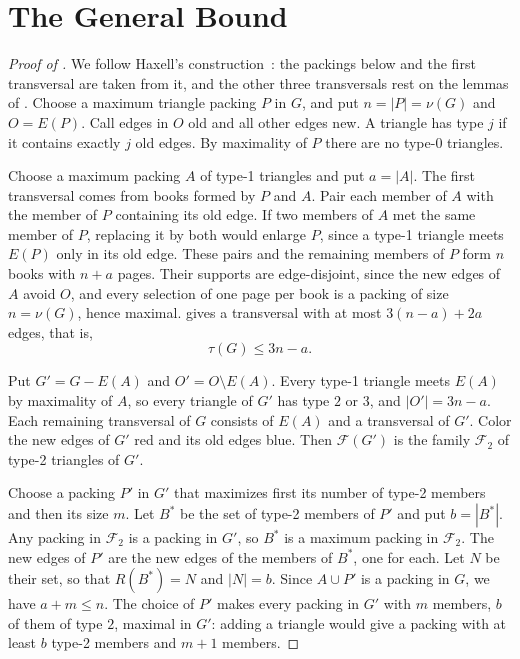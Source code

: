 \documentclass[11pt]{article}
\theoremstyle{remark}
\newcommand{\F}{\mathcal F}
\begin{document}
\section{The General Bound}\label{sec:general}

\begin{proof}[Proof of ]
We follow Haxell's construction~\cite{Haxell}: the packings below and the first transversal are taken from it, and the other three transversals rest on the lemmas of . Choose a maximum triangle packing $P$ in $G$, and put $n=|P|=\nu(G)$ and $O=E(P)$. Call edges in $O$ old and all other edges new. A triangle has type $j$ if it contains exactly $j$ old edges. By maximality of $P$ there are no type-0 triangles.

Choose a maximum packing $A$ of type-1 triangles and put $a=|A|$. The first transversal comes from books formed by $P$ and $A$. Pair each member of $A$ with the member of $P$ containing its old edge. If two members of $A$ met the same member of $P$, replacing it by both would enlarge $P$, since a type-1 triangle meets $E(P)$ only in its old edge. These pairs and the remaining members of $P$ form $n$ books with $n+a$ pages. Their supports are edge-disjoint, since the new edges of $A$ avoid $O$, and every selection of one page per book is a packing of size $n=\nu(G)$, hence maximal.  gives a transversal with at most $3(n-a)+2a$ edges, that is,
\begin{equation}
 \tau(G)\le3n-a.\label{eq:I1}
\end{equation}

Put $G'=G-E(A)$ and $O'=O\setminus E(A)$. Every type-1 triangle meets $E(A)$ by maximality of $A$, so every triangle of $G'$ has type $2$ or $3$, and $|O'|=3n-a$. Each remaining transversal of $G$ consists of $E(A)$ and a transversal of $G'$. Color the new edges of $G'$ red and its old edges blue. Then $\F(G')$ is the family $\F_2$ of type-2 triangles of $G'$.

Choose a packing $P'$ in $G'$ that maximizes first its number of type-2 members and then its size $m$. Let $B^*$ be the set of type-2 members of $P'$ and put $b=|B^*|$. Any packing in $\F_2$ is a packing in $G'$, so $B^*$ is a maximum packing in $\F_2$. The new edges of $P'$ are the new edges of the members of $B^*$, one for each. Let $N$ be their set, so that $R(B^*)=N$ and $|N|=b$. Since $A\cup P'$ is a packing in $G$, we have $a+m\le n$. The choice of $P'$ makes every packing in $G'$ with $m$ members, $b$ of them of type $2$, maximal in $G'$: adding a triangle would give a packing with at least $b$ type-2 members and $m+1$ members.


\end{proof}
\end{document}
